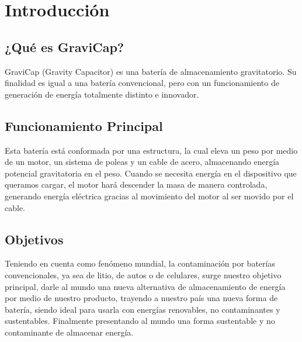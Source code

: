 \chapter{Introducción}
    \section{¿Qué es \textcolor{dark_violet}{GraviCap}?}
        \textcolor{dark_violet}{GraviCap} (Gravity Capacitor) es una batería de almacenamiento gravitatorio. Su finalidad es igual a una batería convencional, pero con un funcionamiento de generación de energía totalmente distinto e innovador.\par

    \section{Funcionamiento Principal}
        Esta batería está conformada por una estructura, la cual eleva un peso por medio de un motor, un sistema de poleas y un cable de acero, almacenando energía potencial gravitatoria en el peso. Cuando se necesita energía en el dispositivo que queramos cargar, el motor hará descender la masa de manera controlada, generando energía eléctrica gracias al movimiento del motor al ser movido por el cable.\par

    \section{Objetivos}
        Teniendo en cuenta como fenómeno mundial, la contaminación por baterías convencionales, ya sea de litio, de autos o de celulares, surge nuestro objetivo principal, darle al mundo una nueva alternativa de almacenamiento de energía por medio de nuestro producto, trayendo a nuestro país una nueva forma de batería, siendo ideal para usarla con energías renovables, no contaminantes y sustentables. Finalmente presentando al mundo una forma sustentable y no contaminante de almacenar energía.\par
        
